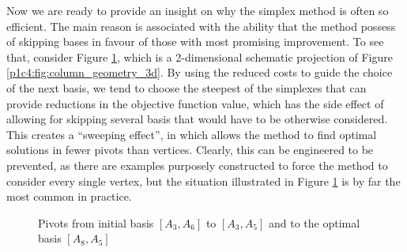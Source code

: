 Now we are ready to provide an insight on why the simplex method is often so efficient. The main reason is associated with the ability that the method possess of skipping bases in favour of those with most promising improvement. To see that, consider Figure \ref{p1c4:fig:column_geometry_projection}, which is a 2-dimensional schematic projection of Figure \ref{p1c4:fig:column_geometry_3d}. By using the reduced costs to guide the choice of the next basis, we tend to choose the steepest of the simplexes that can provide reductions in the objective function value, which has the side effect of allowing for skipping several basis that would have to be otherwise considered. This creates a ``sweeping effect'', in which allows the method to find optimal solutions in fewer pivots than vertices. Clearly, this can be engineered to be prevented, as there are examples purposely constructed to force the method to consider every single vertex, but the situation illustrated in Figure \ref{p1c4:fig:column_geometry_projection} is by far the most common in practice.  


\begin{figure}[h]
	\caption{Pivots from initial basis $[A_3, A_6]$ to $[A_3, A_5]$ and to the optimal basis $[A_8, A_5]$} \label{p1c4:fig:column_geometry_projection}
\end{figure}		
 

